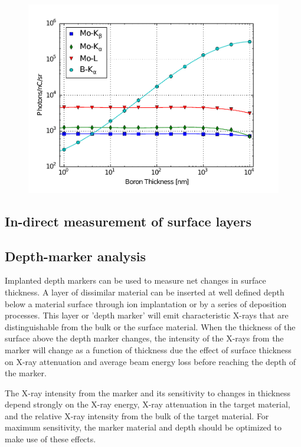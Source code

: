 \documentclass[12pt,letterpaper,final]{article}
\begin{document}
\begin{figure}[!h]
 \centering
  \includegraphics[width=\columnwidth]{figures/BoronLayerXRayIntensityVsThickness.pdf}
 \caption{}
 \label{fig:BoronIntensity}
\end{figure}

\subsection{In-direct measurement of surface layers}

\subsection{Depth-marker analysis}

Implanted depth markers can be used to measure net changes in surface thickness. A layer of dissimilar material can be inserted at well defined depth below a material surface through ion implantation or by a series of deposition processes. This layer or 'depth marker' will emit characteristic X-rays that are distinguishable from the bulk or the surface material. When the thickness of the surface above the depth marker changes, the intensity of the X-rays from the marker will change as a function of thickness due the effect of surface thickness on X-ray attenuation and average beam energy loss before reaching the depth of the marker. 

The X-ray intensity from the marker and its sensitivity to changes in thickness depend strongly on the X-ray energy, X-ray attenuation in the target material, and the relative X-ray intensity from the bulk of the target material. For maximum sensitivity, the marker material and depth should be optimized to make use of these effects.
\end{document}
